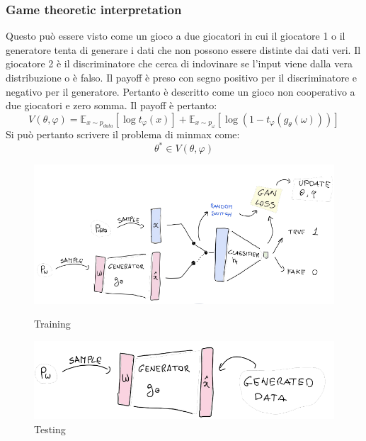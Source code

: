 		\subsubsection{Game theoretic interpretation}
		Questo pu\`o essere visto come un gioco a due giocatori in cui il giocatore 1 o il generatore tenta di generare i dati che non possono essere distinte dai dati veri.
		Il giocatore 2 \`e il discriminatore che cerca di indovinare se l'input viene dalla vera distribuzione o \`e falso.
		Il payoff \`e preso con segno positivo per il discriminatore e negativo per il generatore.
		Pertanto \`e descritto come un gioco non cooperativo a due giocatori e zero somma.
		Il payoff \`e pertanto:
		$$V(\theta,\varphi) = \mathbb{E}_{x\sim p_{data}}[\log t_\varphi(x)]+\mathbb{E}_{x\sim p_\omega}[\log(1-t_\varphi(g_\theta(\omega)))]$$
		Si pu\`o pertanto scrivere il problema di minmax come:
		$$\theta^*\in V(\theta,\varphi)$$
		
		\begin{figure}
			\centering
			\begin{minipage}{.5\textwidth}
				\centering
				\includegraphics[width=1\linewidth]{imgs/chapter12/img16}
				\caption{Training}
				\label{fig:chapter12-16}
			\end{minipage}%
			\begin{minipage}{.5\textwidth}
				\centering
				\includegraphics[width=1\linewidth]{imgs/chapter12/img17}
				\caption{Testing}
				\label{fig:chapter12-17}
			\end{minipage}
		\end{figure}
		

